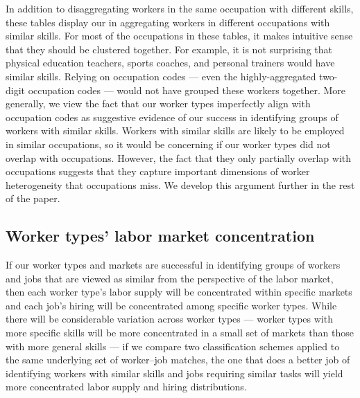 \documentclass[12pt]{article}
\theoremstyle{definition}
\theoremstyle{plain}
\begin{document}
In addition to disaggregating workers in the same occupation with different skills, these tables display our  in aggregating workers in different occupations with similar skills. For most of the occupations in these tables, it makes intuitive sense that they should be clustered together. For example, it is not surprising that physical education teachers, sports coaches, and personal trainers would have similar skills.  Relying on occupation codes --- even the highly-aggregated two-digit occupation codes --- would not have grouped these workers together. More generally, we view the fact that our worker types imperfectly align with occupation codes as suggestive evidence of our success in identifying groups of workers with similar skills. Workers with similar skills are likely to be employed in similar occupations, so it would be concerning if our worker types did not overlap with occupations. However, the fact that they only partially overlap with occupations suggests that they capture important dimensions of worker heterogeneity that occupations miss. We develop this argument further in the rest of the paper. 









\subsection{Worker types' labor market concentration}


\label{sec:hhi}

If our worker types and markets are successful in identifying groups of workers and jobs that are viewed as similar from the perspective of the labor market, then each worker type's labor supply will be concentrated within specific markets and each job’s hiring will be concentrated among specific worker types. While there will be considerable variation across worker types --- worker types with more specific skills will be more concentrated in a small set of markets than those with more general skills --- if we compare two classification schemes applied to the same underlying set of worker--job matches, the one that does a better job of identifying workers with similar skills and jobs requiring similar tasks will yield more concentrated labor supply and hiring distributions.
\end{document}
